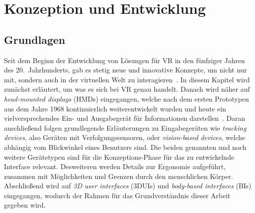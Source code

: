 \section{Konzeption und Entwicklung}

\subsection{Grundlagen}
Seit dem Beginn der Entwicklung von Lösungen für VR in den fünfziger Jahren des 20.~Jahrhunderts, gab es stetig neue und innovative Konzepte, um nicht nur mit, sondern auch in der virtuellen Welt zu interagieren~\cite{virtualreality}. In diesem Kapitel wird zunächst erläutert, um was es sich bei VR genau handelt. Danach wird näher auf \textit{head-mounted displays} (HMDs) eingegangen, welche nach dem ersten Prototypen aus dem Jahre 1968 kontinuierlich weiterentwickelt wurden und heute ein vielversprechendes Ein- und Ausgabegerät für Informationen darstellen~\cite{vrfuture}. Daran anschließend folgen grundlegende Erläuterungen zu Eingabegeräten wie \textit{tracking devices}, also Geräten mit Verfolgungssensoren, oder \textit{vision-based devices}, welche abhängig vom Blickwinkel eines Benutzers sind. Die beiden genannten und noch weitere Gerätetypen sind für die Konzeptions-Phase für das zu entwickelnde Interface relevant. Desweiteren werden Details zur Ergonomie aufgeführt, zusammen mit Möglichkeiten und Grenzen durch den menschlichen Körper. Abschließend wird auf \textit{3D user interfaces} (3DUIs) und \textit{body-based interfaces} (BIs) eingegangen, wodurch der Rahmen für das Grundverständnis dieser Arbeit gegeben wird.

